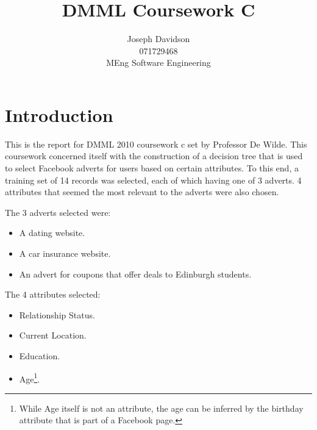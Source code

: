 \documentclass[8pt]{article}
\title{DMML Coursework C}
\author{Joseph Davidson \\ 071729468 \\ MEng Software Engineering}
\date{}
\begin{document}
  \maketitle

  \section{Introduction}
    This is the report for DMML 2010 coursework c set by Professor De Wilde. This coursework concerned itself with
    the construction of a decision tree that is used to select Facebook adverts for users based on certain attributes.
    To this end, a training set of 14 records was selected, each of which having one of 3 adverts. 4 attributes that
    seemed the most relevant to the adverts were also chosen.

    The 3 adverts selected were:
    \begin{itemize}
      \setlength{\itemsep}{1pt}
      \setlength{\parskip}{0pt}
      \setlength{\parsep}{0pt}
      \item A dating website.
      \item A car insurance website.
      \item An advert for coupons that offer deals to Edinburgh students.
    \end{itemize}

    The 4 attributes selected:
    \begin{itemize}
      \setlength{\itemsep}{1pt}
      \setlength{\parskip}{0pt}
      \setlength{\parsep}{0pt}
      \item Relationship Status.
      \item Current Location.
      \item Education.
      \item Age\footnote{While Age itself is not an attribute, the age can be inferred by the birthday attribute that is
      part of a Facebook page.}.
    \end{itemize}
\end{document}
